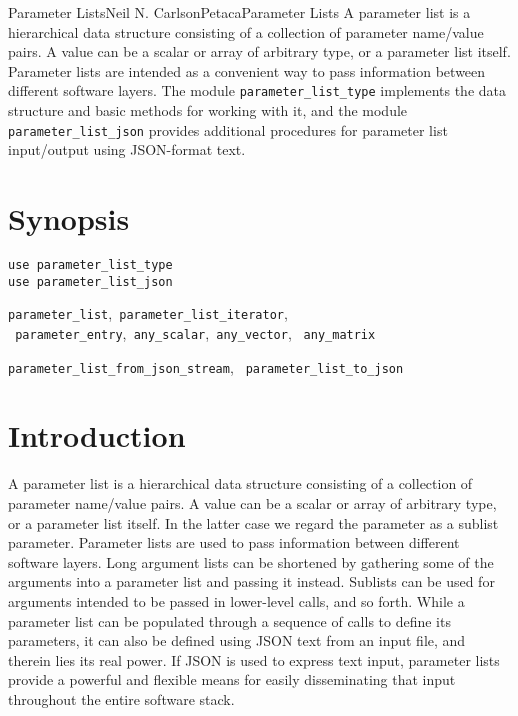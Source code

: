 \documentclass[11pt]{article}
\begin{document}

\begin{Name}{3}{Parameter Lists}{Neil N. Carlson}{Petaca}{Parameter Lists}
A parameter list is a hierarchical data structure consisting of a collection
of parameter name/value pairs.  A value can be a scalar or array of arbitrary
type, or a parameter list itself.  Parameter lists are intended as a convenient
way to pass information between different software layers.  The module
\texttt{parameter_list_type} implements the data structure and basic methods
for working with it, and the module \texttt{parameter_list_json}
provides additional procedures for parameter list input/output using
JSON-format text.
\end{Name}

\section{Synopsis}
\begin{description}[style=nextline]
\item[Usage]
  \texttt{use parameter_list_type}\\
  \texttt{use parameter_list_json}
\item[Derived Types]
  \texttt{parameter_list},\texttt{ parameter_list_iterator},\\
  \texttt{ parameter_entry},\texttt{ any_scalar},\texttt{ any_vector},%
  \texttt{ any_matrix}
\item[Procedures]
  \texttt{parameter_list_from_json_stream},
  \texttt{ parameter_list_to_json}
\end{description}

\section{Introduction}
A parameter list is a hierarchical data structure consisting of a collection
of parameter name/value pairs.  A value can be a scalar or array of arbitrary
type, or a parameter list itself.  In the latter case we regard the parameter
as a sublist parameter.  Parameter lists are used to pass information between
different software layers.  Long argument lists can be shortened by gathering
some of the arguments into a parameter list and passing it instead.  Sublists
can be used for arguments intended to be passed in lower-level calls, and so
forth.  While a parameter list can be populated through a sequence of calls
to define its parameters, it can also be defined using JSON text from an input
file, and therein lies its real power.  If JSON is used to express text input,
parameter lists provide a powerful and flexible means for easily disseminating
that input throughout the entire software stack.
\end{document}
